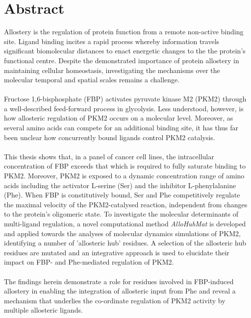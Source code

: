 \section*{Abstract}
Allostery is the regulation of protein function from a remote non-active binding site. Ligand binding incites a rapid process whereby information travels significant biomolecular distances to enact energetic changes to the the protein's functional centre. Despite the demonstrated importance of protein allostery in maintaining cellular homeostasis, investigating the mechanisms over the molecular temporal and spatial scales remains a challenge.
%
%
\\\\
%
%
Fructose 1,6-bisphosphate (FBP) activates pyruvate kinase M2 (PKM2) through a well-described feed-forward process in glycolysis. Less understood, however, is how allosteric regulation of PKM2 occurs on a molecular level. Moreover, as several amino acids can compete for an additional binding site, it has thus far been unclear how concurrently bound ligands control PKM2 catalysis.
%
%
\\\\
%
%
This thesis shows that, in a panel of cancer cell lines, the intracellular concentration of FBP exceeds that which is required to fully saturate binding to PKM2. Moreover, PKM2 is exposed to a dynamic concentration range of amino acids including the activator L-serine (Ser) and the inhibitor L-phenylalanine (Phe). When FBP is constitutively bound, Ser and Phe competitively regulate the maximal velocity of the PKM2-catalysed reaction, independent from changes to the protein's oligomeric state. To investigate the molecular determinants of multi-ligand regulation, a novel computational method \textit{AlloHubMat} is developed and applied towards the analyses of molecular dynamics simulations of PKM2, identifying a number of 'allosteric hub' residues. A selection of the allosteric hub residues are mutated and an integrative approach is used to elucidate their impact on FBP- and Phe-mediated regulation of PKM2. 
%
%
\\\\
%
%
The findings herein demonstrate a role for residues involved in FBP-induced allostery in enabling the integration of allosteric input from Phe and reveal a mechanism that underlies the co-ordinate regulation of PKM2 activity by multiple allosteric ligands.


